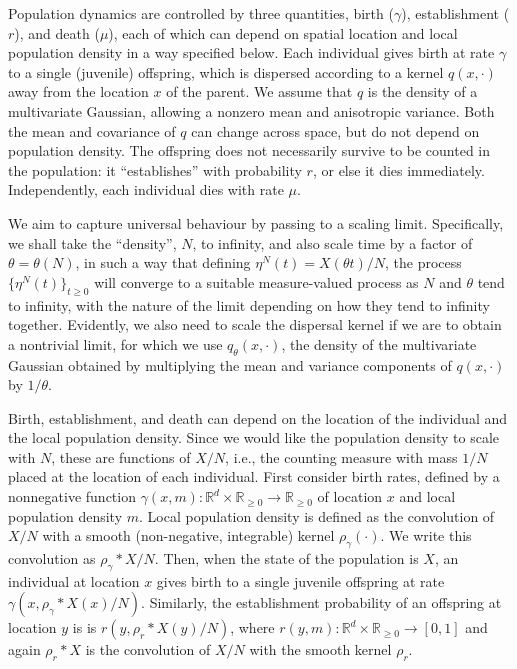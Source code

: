 \documentclass[12pt]{article}
\newcommand{\IR}{\mathbb R}
\newcommand{\kernel}{\rho}  %
\newcommand{\smooth}[1]{\kernel_{#1} \! * \!}  %
\numberwithin{equation}{section}
\begin{document}
Population dynamics are controlled by three quantities,
birth ($\gamma$), establishment ($r$), and death ($\mu$),
each of which can depend on spatial location and local population density
in a way specified below.
Each individual gives birth at rate $\gamma$ to a single (juvenile) offspring,
which is dispersed according to a kernel $q(x, \cdot)$ away from the location $x$ of the parent.
We assume that $q$ is the density of a multivariate Gaussian,
allowing a nonzero mean and anisotropic variance.
Both the mean and covariance of $q$ can change across space,
but do not depend on population density.
The offspring does not necessarily survive to be counted in the population:
it ``establishes'' with probability $r$,
or else it dies immediately.
Independently, each individual dies with rate $\mu$.

We aim to capture universal behaviour by passing to a scaling limit. Specifically, 
we shall take the ``density'', $N$, to infinity,
and also scale time by a factor of $\theta = \theta(N)$,
in such a way that defining $\eta^N(t) = X(\theta t) / N$,
the process $\{\eta^N(t)\}_{t \ge 0}$
will converge to a suitable measure-valued process
as $N$ and $\theta$ tend to infinity,
with the nature of the limit depending on how they tend to infinity together.
Evidently, we also need to scale the dispersal kernel if we are to obtain a
nontrivial limit, for which we use $q_\theta(x,\cdot)$,
the density of the multivariate Gaussian obtained by
multiplying the mean and variance components of $q(x,\cdot)$ by $1/\theta$.

Birth, establishment, and death can depend on the location of the individual
and the local population density.
Since we would like the population density to scale with $N$,
these are functions of $X/N$, i.e.,
the counting measure with mass $1/N$ placed at the location of each individual.
First consider birth rates, defined by
a nonnegative function $\gamma(x, m) : \IR^d \times \IR_{\ge 0} \to \IR_{\ge 0}$
of location $x$ 
and local population density $m$.
Local population density is defined as the convolution of $X/N$ with 
a smooth (non-negative, integrable) kernel $\rho_\gamma(\cdot)$.
We write this convolution as $\smooth{\gamma} X/N$.
Then, when the state of the population is $X$, an individual at location $x$ 
gives birth to a single juvenile offspring at rate
$\gamma(x, \smooth{\gamma} X(x) / N)$.
Similarly, the establishment probability of an offspring at location $y$ is
is $r(y, \smooth{r} X(y) / N)$,
where $r(y, m) : \IR^d \times \IR_{\ge 0} \to [0, 1]$
and again $\smooth{r} X$ is the convolution of 
$X/N$ with the smooth kernel $\rho_r$.
\end{document}
